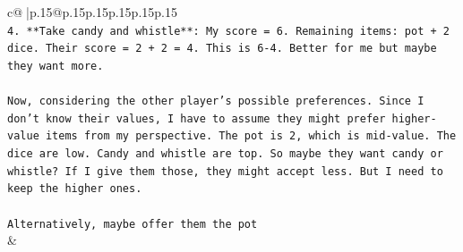 \documentclass{article}
\begin{document}
{\begin{supertabular}{c@{$\;$}|p{.15\linewidth}@{}p{.15\linewidth}p{.15\linewidth}p{.15\linewidth}p{.15\linewidth}p{.15\linewidth}}
{{{\\ 
\texttt{4. **Take candy and whistle**: My score = 6. Remaining items: pot + 2 dice. Their score = 2 + 2 = 4. This is 6{-}4. Better for me but maybe they want more.} \\
\\ 
\texttt{Now, considering the other player's possible preferences. Since I don't know their values, I have to assume they might prefer higher{-}value items from my perspective. The pot is 2, which is mid{-}value. The dice are low. Candy and whistle are top. So maybe they want candy or whistle? If I give them those, they might accept less. But I need to keep the higher ones.} \\
\\ 
\texttt{Alternatively, maybe offer them the pot} \\
            }
        }
    }
    & \\ \\


\end{supertabular}}
\end{document}
